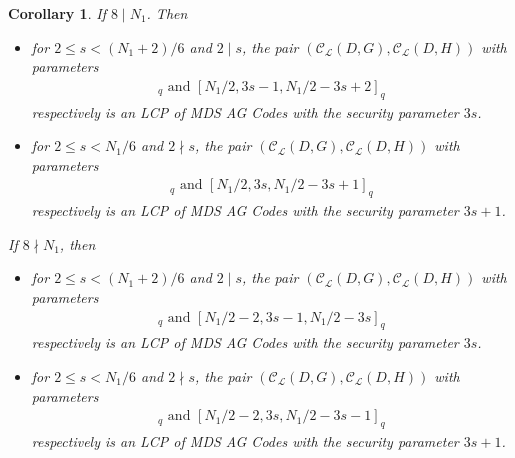 \documentclass[journal,12pt,onecolumn]{IEEEtran}
\newtheorem{corollary}[theorem]{Corollary}
\begin{document}
\begin{corollary}\label{LCP_EC}
    If $8\mid N_1$. Then 
    \begin{itemize}
        \item[(1)] for $2\le s <(N_1+2)/6$ and $2\mid s$, the pair $(\mathcal{C}_{\mathcal{L}}(D,G),\mathcal{C}_{\mathcal{L}}(D,H))$ with parameters
        \begin{gather*}
            [N_1/2,N_1/2-3s+1,3s]_q\text{ and }[N_1/2,3s-1,N_1/2-3s+2]_q
        \end{gather*}
        respectively is an LCP of MDS AG Codes with the security parameter $3s$. 
        \item[(2)] for $2\le s <N_1/6$ and $2\nmid s$, the pair $(\mathcal{C}_{\mathcal{L}}(D,G),\mathcal{C}_{\mathcal{L}}(D,H))$ with parameters
        \begin{gather*}
            [N_1/2,N_1/2-3s,3s+1]_q\text{ and }[N_1/2,3s,N_1/2-3s+1]_q
        \end{gather*}
        respectively is an LCP of MDS AG Codes with the security parameter $3s+1$. 
    \end{itemize}
    If $8\nmid N_1$, then
    \begin{itemize}
        \item[(3)] for $2\le s <(N_1+2)/6$ and $2\mid s$, the pair $(\mathcal{C}_{\mathcal{L}}(D,G),\mathcal{C}_{\mathcal{L}}(D,H))$ with parameters
        \begin{gather*}
            [N_1/2-2,N_1/2-3s-1,3s]_q\text{ and }[N_1/2-2,3s-1,N_1/2-3s]_q
        \end{gather*}
        respectively is an LCP of MDS AG Codes with the security parameter $3s$. 
        \item[(4)] for $2\le s <N_1/6$ and $2\nmid s$, the pair $(\mathcal{C}_{\mathcal{L}}(D,G),\mathcal{C}_{\mathcal{L}}(D,H))$ with parameters
        \begin{gather*}
            [N_1/2-2,N_1/2-3s-2,3s+1]_q\text{ and }[N_1/2-2,3s,N_1/2-3s-1]_q
        \end{gather*}
        respectively is an LCP of MDS AG Codes with the security parameter $3s+1$. 
    \end{itemize}
\end{corollary}
\end{document}
